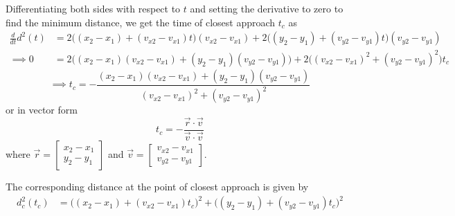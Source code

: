 Differentiating both sides with respect to \( t \) and setting the derivative to zero to find the minimum distance, we get the time of closest approach \( t_c \) as
\begin{align*}
    \frac{d}{dt}d^2(t)
    & =
    2\big((x_2 - x_1) + (v_{x2} - v_{x1})t\big)(v_{x2} - v_{x1}) + 2\big((y_2 - y_1) + (v_{y2} - v_{y1})t\big)(v_{y2} - v_{y1})
    \\ \implies
    0
    & =
    2\big((x_2 - x_1)(v_{x2} - v_{x1}) + (y_2 - y_1)(v_{y2} - v_{y1})\big) + 2\big((v_{x2} - v_{x1})^2 + (v_{y2} - v_{y1})^2\big) t_c
\end{align*}
\begin{equation*}
    \implies
    \boxed{
        t_c
        =
        -\frac{(x_2 - x_1)(v_{x2} - v_{x1}) + (y_2 - y_1)(v_{y2} - v_{y1})}{(v_{x2} - v_{x1})^2 + (v_{y2} - v_{y1})^2}
    }
\end{equation*}
or in vector form
\begin{equation*}
    t_c
    =
    -\frac{\vec{r} \cdot \vec{v}}{\vec{v} \cdot \vec{v}}
\end{equation*}
where \( \vec{r} = \begin{bmatrix} x_2 - x_1 \\ y_2 - y_1 \end{bmatrix} \) and \( \vec{v} = \begin{bmatrix} v_{x2} - v_{x1} \\ v_{y2} - v_{y1} \end{bmatrix} \).

The corresponding distance at the point of closest approach is given by
\begin{align*}
    d_c^2(t_c)
    & =
    \big((x_2 - x_1) + (v_{x2} - v_{x1})t_c\big)^2 + \big((y_2 - y_1) + (v_{y2} - v_{y1})t_c\big)^2
\end{align*}